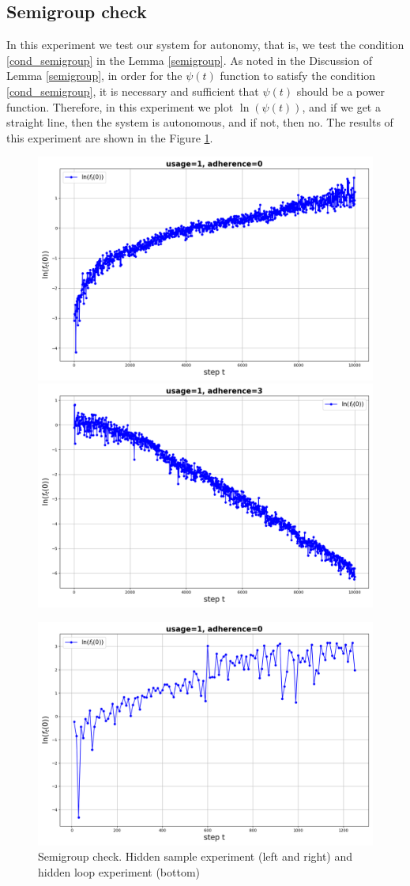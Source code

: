 \documentclass{article}
\begin{document}
    \subsection{Semigroup check} \label{exp_4}

        In this experiment we test our system for autonomy, that is, we test the condition \eqref{cond_semigroup} in the Lemma \ref{semigroup}. As noted in the Discussion of Lemma \ref{semigroup}, in order for the $\psi(t)$ function to satisfy the condition \eqref{cond_semigroup}, it is necessary and sufficient that $\psi(t)$ should be a power function. Therefore, in this experiment we plot $\ln(\psi(t))$, and if we get a straight line, then the system is autonomous, and if not, then no. The results of this experiment are shown in the Figure \ref{fig_exp_4}.

        \begin{figure}[h!]
            \centering
            \includegraphics[width=0.49\linewidth]{pictures/semigroup_sample_1_0.png}
            \includegraphics[width=0.49\linewidth]{pictures/semigroup_sample_1_3.png}
            
            \includegraphics[width=0.49\linewidth]{pictures/semigroup_loop_1_0.png}
            
            \caption{Semigroup check. Hidden sample experiment (left and right) and hidden loop experiment (bottom)}
            \label{fig_exp_4}
        \end{figure}
\end{document}
